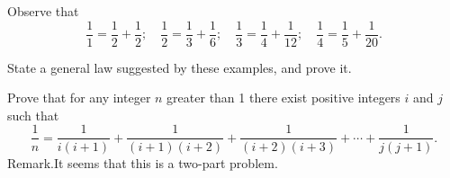 Observe that\[\frac{1}{1}= \frac{1}{2}+\frac{1}{2};\quad \frac{1}{2}=\frac{1}{3}+\frac{1}{6};\quad \frac{1}{3}=\frac{1}{4}+\frac{1}{12};\quad \frac{1}{4}= \frac{1}{5}+\frac{1}{20}. \]

State a general law suggested by these examples, and prove it.

Prove that for any integer $n$ greater than 1 there exist positive integers $i$ and $j$ such that\[\frac{1}{n}= \frac{1}{i(i+1)}+\frac{1}{(i+1)(i+2)}+\frac{1}{(i+2)(i+3)}+\cdots+\frac{1}{j(j+1)}. \]Remark.It seems that this is a two-part problem.
